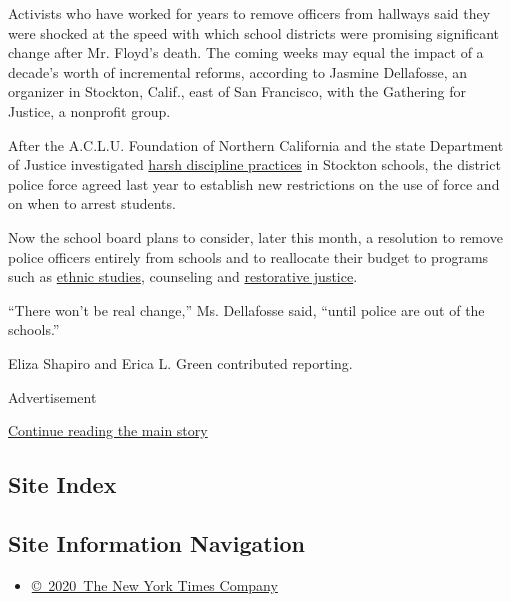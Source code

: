 Activists who have worked for years to remove officers from hallways
said they were shocked at the speed with which school districts were
promising significant change after Mr. Floyd's death. The coming weeks
may equal the impact of a decade's worth of incremental reforms,
according to Jasmine Dellafosse, an organizer in Stockton, Calif., east
of San Francisco, with the Gathering for Justice, a nonprofit group.

After the A.C.L.U. Foundation of Northern California and the state
Department of Justice investigated
\href{https://www.aclunc.org/our-work/legal-docket/aclu-northern-california-v-stockton-unified-school-district-school-prison}{harsh
discipline practices} in Stockton schools, the district police force
agreed last year to establish new restrictions on the use of force and
on when to arrest students.

Now the school board plans to consider, later this month, a resolution
to remove police officers entirely from schools and to reallocate their
budget to programs such as
\href{https://www.nytimes.com/2019/08/15/us/california-ethnic-studies.html}{ethnic
studies}, counseling and
\href{https://www.nytimes.com/2013/04/04/education/restorative-justice-programs-take-root-in-schools.html}{restorative
justice}.

``There won't be real change,'' Ms. Dellafosse said, ``until police are
out of the schools.''

Eliza Shapiro and Erica L. Green contributed reporting.

Advertisement

\protect\hyperlink{after-bottom}{Continue reading the main story}

\hypertarget{site-index}{%
\subsection{Site Index}\label{site-index}}

\hypertarget{site-information-navigation}{%
\subsection{Site Information
Navigation}\label{site-information-navigation}}

\begin{itemize}
\tightlist
\item
  \href{https://help.nytimes.com/hc/en-us/articles/115014792127-Copyright-notice}{©~2020~The
  New York Times Company}
\end{itemize}


